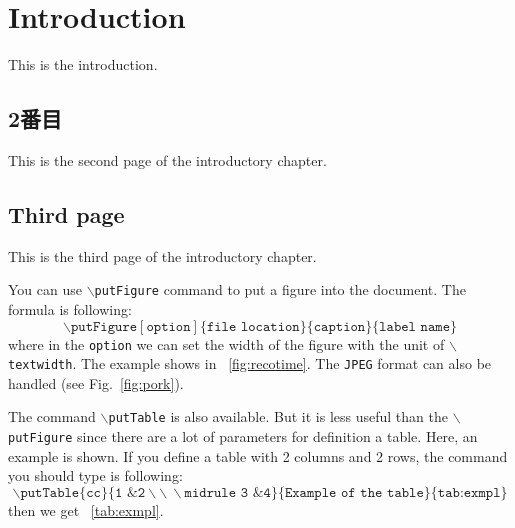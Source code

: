 \chapter{Introduction}
This is the introduction. 
\newpage
\section{2番目}
This is the second page of the introductory chapter. 
\newpage
\section{Third page}
This is the third page of the introductory chapter.

You can use \texttt{$\backslash$putFigure} command to put a figure into the document. 
The formula is following: 
\begin{equation}
\backslash\texttt{putFigure}[\texttt{option}]\{\texttt{file location}\}
\{\texttt{caption}\}\{\texttt{label name}\}
\end{equation}
where in the \texttt{option} we can set the width of the figure with the unit of \texttt{$\backslash$textwidth}. 
The example shows in \figurename~\ref{fig:recotime}. 
The \texttt{JPEG} format can also be handled (see Fig.~\ref{fig:pork}). 

The command \texttt{$\backslash$putTable} is also available. 
But it is less useful than the \texttt{$\backslash$putFigure} 
since there are a lot of parameters for definition a table.
Here, an example is shown. 
If you define a table with 2 columns and 2 rows, the command you should 
type is following: 
\begin{equation}
\backslash\texttt{putTable}\{\texttt{cc}\}
\{\texttt{1 \& 2}\backslash\backslash\ \backslash\texttt{midrule 3 \& 4}\}
\{\texttt{Example of the table}\}\{\texttt{tab:exmpl}\}
\end{equation}
then we get \tablename~\ref{tab:exmpl}. 


